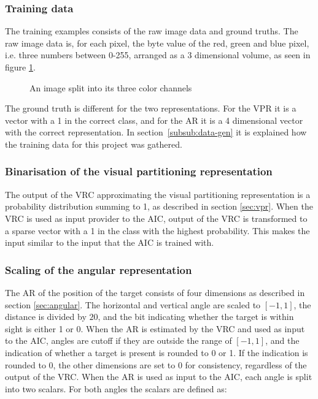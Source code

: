 \subsubsection{Training data}
The training examples consists of the raw image data and ground truths. The raw image data is, for each pixel, the byte value of the red, green and blue pixel, i.e. three numbers between 0-255, arranged as a 3 dimensional volume, as seen in figure \ref{fig:split}.

\begin{figure}[H]
    \centering
    
    \caption{An image split into its three color channels}
    \label{fig:split}
\end{figure}
\noindent
The ground truth is different for the two representations. For the VPR it is a vector with a 1 in the correct class, and for the AR it is a 4 dimensional vector with the correct representation.
In section~\ref{subsub:data-gen} it is explained how the training data for this project was gathered.


\subsubsection{Binarisation of the visual partitioning representation}
The output of the VRC approximating the visual partitioning representation is a probability distribution summing to 1, as described in section \ref{sec:vpr}. When the VRC is used as input provider to the AIC, output of the VRC is transformed to a sparse vector with a 1 in the class with the highest probability. This makes the input similar to the input that the AIC is trained with.

\subsubsection{Scaling of the angular representation}
The AR of the position of the target consists of four dimensions as described in section \ref{sec:angular}. The horizontal and vertical angle are scaled to $[-1,1]$, the distance is divided by $20$, and the bit indicating whether the target is within sight is either 1 or 0. When the AR is estimated by the VRC and used as input to the AIC, angles are cutoff if they are outside the range of $[-1,1]$, and the indication of whether a target is present is rounded to 0 or 1. If the indication is rounded to 0, the other dimensions are set to 0 for consistency, regardless of the output of the VRC. When the AR is used as input to the AIC, each angle is split into two scalars. For both angles the scalars are defined as:

